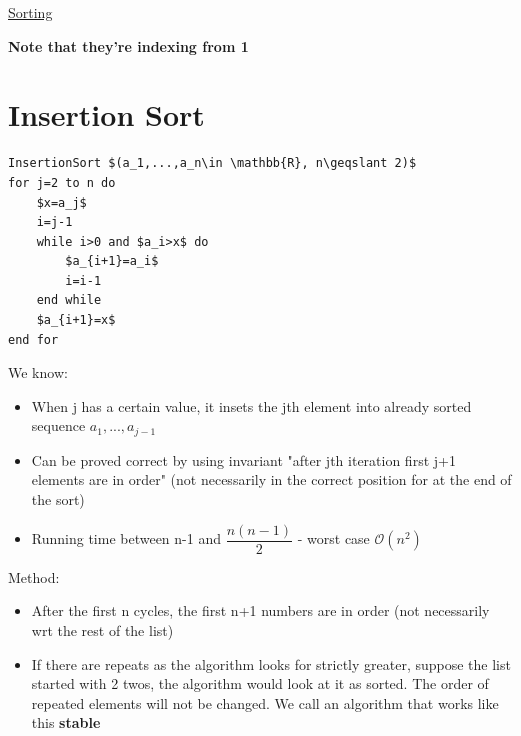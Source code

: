 \documentclass{article}[18pt]
\begin{document}
\begin{center}
\underline{\huge Sorting}
\end{center}
\begin{center}
	{\large \textbf{Note that they're indexing from 1}}	
\end{center}
\section{Insertion Sort}

\begin{lstlisting}
InsertionSort $(a_1,...,a_n\in \mathbb{R}, n\geqslant 2)$
for j=2 to n do
	$x=a_j$
	i=j-1
	while i>0 and $a_i>x$ do
		$a_{i+1}=a_i$
		i=i-1
	end while
	$a_{i+1}=x$
end for
\end{lstlisting}
We know:
\begin{itemize}
	\item When j has a certain value, it insets the jth element into already sorted sequence $a_1,...,a_{j-1}$
	\item Can be proved correct by using invariant "after jth iteration first j+1 elements are in order" (not necessarily in the correct position for at the end of the sort)
	\item Running time between n-1 and $\dfrac{n(n-1)}{2}$  - worst case $\mathcal{O}(n^2)$
\end{itemize}
Method:
\begin{itemize}
	\item After the first n cycles, the first n+1 numbers are in order (not necessarily wrt the rest of the list)
	\item If there are repeats as the algorithm looks for strictly greater, suppose the list started with 2 twos, the algorithm would look at it as sorted. The order of repeated elements will not be changed. We call an algorithm that works like this \textbf{stable}
\end{itemize}
\end{document}
